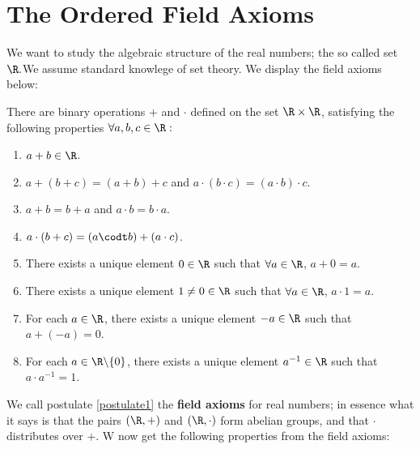 
\section{The Ordered Field Axioms}

We want to study the algebraic structure of the real numbers; the so called set $\R. $We assume standard knowlege of set 
theory. We display the field axioms below:

\begin{postulate}\label{postulate1}
  There are binary operations $+$ and $\cdot$ defined on the set $\R \times \R$, satisfying the following properties $\forall a,b,c \in \R:$

    \begin{enumerate}[label = (\arabic*)]
      \item $a+b \in \R$.

      \item $a+(b+c)=(a+b)+c$ and $a \cdot (b \cdot c)= (a \cdot b) \cdot c$.

      \item $a+b=b+a$ and $a \cdot b = b \cdot a$.

      \item $a \cdot (b+c) = (a \codt b)+(a \cdot c)$.

      \item There exists a unique element $0 \in \R$ such that $\forall a \in \R$, $a+0=a$.

      \item There exists a unique element $1 \neq 0 \in \R$ such that $\forall a \in \R$, $a \cdot 1=a$.

      \item For each $a \in \R$, there exists a unique element $-a \in \R$ such that $a+(-a)=0$.

      \item For each $a \in \R\backslash{\{0\}}$, there exists a unique element $a^{-1} \in \R$ such that $a \cdot a^{-1}=1$.
    \end{enumerate}
\end{postulate}

We call postulate \ref{postulate1} the \textbf{field axioms} for real numbers; in essence what it says is that the pairs 
$(\R,+)$ and $(\R,\cdot)$ form abelian groups, and that $\cdot$ distributes over $+$. W now get the following properties from the field axioms:

